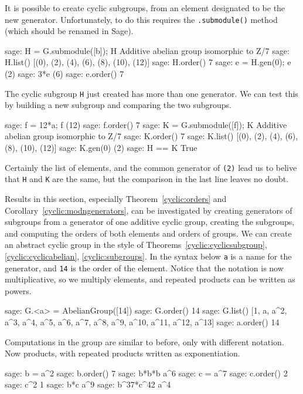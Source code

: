 %
It is possible to create cyclic subgroups, from an element designated to be the new generator.  Unfortunately, to do this requires the \verb?.submodule()? method (which should be renamed in Sage).
%
\begin{sageexample}
sage: H = G.submodule([b]); H
Additive abelian group isomorphic to Z/7
sage: H.list()
[(0), (2), (4), (6), (8), (10), (12)]
sage: H.order()
7
sage: e = H.gen(0); e
(2)
sage: 3*e
(6)
sage: e.order()
7
\end{sageexample}
%
The cyclic subgroup \verb?H? just created has more than one generator.  We can test this by building a new subgroup and comparing the two subgroups.
%
\begin{sageexample}
sage: f = 12*a; f
(12)
sage: f.order()
7
sage: K = G.submodule([f]); K
Additive abelian group isomorphic to Z/7
sage: K.order()
7
sage: K.list()
[(0), (2), (4), (6), (8), (10), (12)]
sage: K.gen(0)
(2)
sage: H == K
True
\end{sageexample}
%
Certainly the list of elements, and the common generator of \verb?(2)? lead us to belive that \verb?H? and \verb?K? are the same, but the comparison in the last line leaves no doubt.\par
%
Results in this section, especially Theorem~\ref{cyclic:orders} and Corollary~\ref{cyclic:modngenerators}, can be investigated by creating generators of subgroups from a generator of one additive cyclic group, creating the subgroups, and computing the orders of both elements and orders of groups.
%
%
We can create an abstract cyclic group in the style of Theorems~\ref{cyclic:cyclicsubgroup}, \ref{cyclic:cyclicabelian}, \ref{cyclic:subgroups}.  In the syntax below \verb?a? is a name for the generator, and \verb?14? is the order of the element.  Notice that the notation is now multiplicative, so we multiply elements, and repeated products can be written as powers.
%
\begin{sageexample}
sage: G.<a> = AbelianGroup([14])
sage: G.order()
14
sage: G.list()
[1, a, a^2, a^3, a^4, a^5, a^6, a^7, a^8, a^9, a^10, a^11, a^12, a^13]
sage: a.order()
14
\end{sageexample}
%
Computations in the group are similar to before, only with different notation.  Now products, with repeated products written as exponentiation.
%
\begin{sageexample}
sage: b = a^2
sage: b.order()
7
sage: b*b*b
a^6
sage: c = a^7
sage: c.order()
2
sage: c^2
1
sage: b*c
a^9
sage: b^37*c^42
a^4
\end{sageexample}
